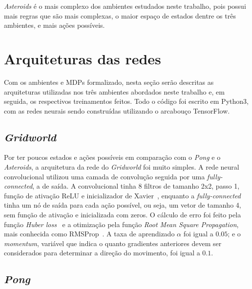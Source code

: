 \textit{Asteroids} é o mais complexo dos ambientes estudados neste trabalho, pois possui mais regras que são mais complexas, o maior espaço de estados dentre os três ambientes, e mais ações possíveis. 


\section{Arquiteturas das redes}
\label{sec:arq}

Com os ambientes e MDPs formalizado, nesta seção serão descritas as arquiteturas utilizadas nos três ambientes abordados neste trabalho e, em seguida, os respectivos treinamentos feitos.
Todo o código foi escrito em Python3, com as redes neurais sendo construídas utilizando o arcabouço TensorFlow.

\subsection{\textit{Gridworld}}
\label{sec:arq_gw}

Por ter poucos estados e ações possíveis em comparação com o \textit{Pong} e o \textit{Asteroids}, a arquitetura da rede do \textit{Gridworld} foi muito simples.
A rede neural convolucional utilizou uma camada de convolução seguida por uma \textit{fully-connected}, a de saída.
A convolucional tinha 8 filtros de tamanho 2x2, passo 1, função de ativação ReLU e inicializador de Xavier~\cite{pmlr-v9-glorot10a}, enquanto a \textit{fully-connected} tinha um nó de saída para cada ação possível, ou seja, um vetor de tamanho 4, sem função de ativação e inicializada com zeros.
O cálculo de erro foi feito pela função \textit{Huber loss}~\cite{huber_loss} e a otimização pela função \textit{Root Mean Square Propagation}, mais conhecida como RMSProp~\cite{rmsprop}.
A taxa de aprendizado $\alpha$ foi igual a $0.05$;
e o \textit{momentum}, variável que indica o quanto gradientes anteriores devem ser considerados para determinar a direção do movimento, foi igual a $0.1$.

\subsection{\textit{Pong}}
\label{sec:arq_pong}

